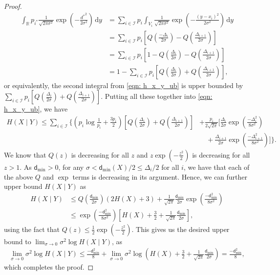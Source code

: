\documentclass[11pt]{article}
\newcommand{\calI}{\mathcal{I}}
\newcommand{\bbR}{\mathbb{R}}
\newcommand{\intR}{\int_{\bbR}}
\renewcommand{\d}{\,\mathrm{d}}
\newcommand{\dmin}{\mathsf{d}_{\min}}
\begin{document}
\begin{proof}[Proof]
\begin{align*}
			\intR p_{i^*} \tfrac{1}{\sqrt{2\pi \sigma^2}}\exp\left(-\tfrac{{d^*}^2}{2\sigma^2}\right) \d y &= \sum_{i \in \calI} p_i \int_{V_i} \tfrac{1}{\sqrt{2\pi \sigma^2}}\exp\left(-\tfrac{(y-x_i)^2}{2\sigma^2}\right) \d y\\
			&= \sum_{i \in \calI} p_i \left[Q\left(\tfrac{-\Delta_i}{2\sigma}\right)-Q\left(\tfrac{\Delta_{i+1}}{2\sigma}\right)\right]\\
			&= \sum_{i \in \calI} p_i \left[1 - Q\left(\tfrac{\Delta_i}{2\sigma}\right)-Q\left(\tfrac{\Delta_{i+1}}{2\sigma}\right)\right]\\
			&= 1 - \sum_{i \in \calI} p_i \left[Q\left(\tfrac{\Delta_i}{2\sigma}\right)+Q\left(\tfrac{\Delta_{i+1}}{2\sigma}\right)\right],
		\end{align*}
		or equivalently, the second integral from \eqref{eqn: h_x_y_ub} is upper bounded by $\sum_{i \in \calI} p_i \left[Q\left(\tfrac{\Delta_i}{2\sigma}\right)+Q\left(\tfrac{\Delta_{i+1}}{2\sigma}\right)\right]$. Putting all these together into \eqref{eqn: h_x_y_ub}, we have
		\begin{align*}
			H(X \mid Y) \leq \sum_{i \in \calI} \Big\{ \left(p_i\log \tfrac{1}{p_i}+\tfrac{3p_i}{2}\right) \left[Q\left(\tfrac{\Delta_i}{2\sigma}\right)+Q\left(\tfrac{\Delta_{i+1}}{2\sigma}\right)\right] &+ \frac{p_i}{2\sqrt{2\pi}}\Big[\tfrac{\Delta_i}{2\sigma}\exp\left(\tfrac{-\Delta_i^2}{8\sigma^2}\right)\\
			&\quad + \tfrac{\Delta_{i+1}}{2\sigma}\exp\left(\tfrac{-\Delta_{i+1}^2}{8\sigma^2}\right)\Big] \Big\}.
		\end{align*}
		We know that $Q(z)$ is decreasing for all $z$ and $z\exp(-\frac{z^2}{2})$ is decreasing for all $z > 1$. As $\dmin > 0$, for any $\sigma < \dmin(X)/2 \leq \Delta_i/2$ for all $i$, we have that each of the above $Q$ and $\exp$ terms is decreasing in its argument. Hence, we can further upper bound $H(X \mid Y)$ as
		\begin{align*}
			H(X \mid Y) &\leq Q\left(\tfrac{\dmin}{2\sigma}\right)(2H(X)+3) + \frac{1}{\sqrt{2\pi}}\tfrac{\dmin}{2\sigma}\exp\left(\tfrac{-\dmin^2}{8\sigma^2}\right)\\
			&\leq \exp\left(\tfrac{-\dmin^2}{8\sigma^2}\right) \left[H(X) + \tfrac32 + \tfrac1{\sqrt{2\pi}} \tfrac{\dmin}{2\sigma}\right],
		\end{align*}
		using the fact that $Q(z) \leq \frac{1}{2}\exp(-\frac{z^2}{2})$. This gives us the desired upper bound to $\lim_{\sigma \to 0}\sigma^2 \log H(X \mid Y)$, as
		\begin{align*}
			\lim_{\sigma \to 0} \sigma^2 \log H(X \mid Y) \leq \tfrac{-\dmin^2}{8} + \lim_{\sigma \to 0} \sigma^2 \log\left(H(X) + \tfrac32 + \tfrac1{\sqrt{2\pi}} \tfrac{\dmin}{2\sigma}\right) = \frac{-\dmin^2}{8},
		\end{align*}
		which completes the proof.
	\end{proof}
	
\end{document}
